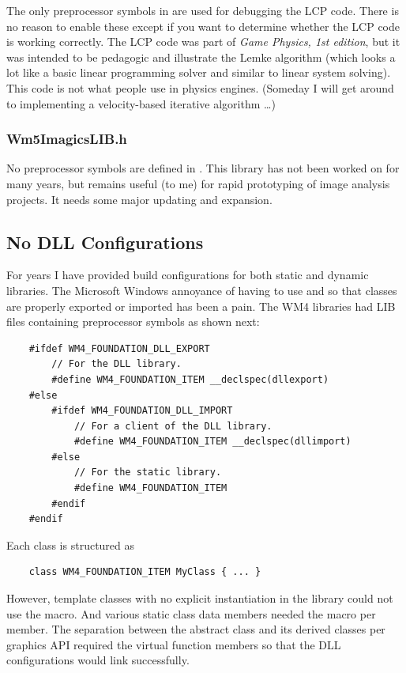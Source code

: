 \documentclass{article}
\begin{document}
The only preprocessor symbols in  are used for debugging
the LCP code.  There is no reason to enable these except if you want to
determine whether the LCP code is working correctly.  The LCP code was
part of {\em Game Physics, 1st edition}, but it was intended to be pedagogic
and illustrate the Lemke algorithm (which looks a lot like a basic linear
programming solver and similar to linear system solving).  This code is not
what people use in physics engines.  (Someday I will get around to implementing
a velocity-based iterative algorithm \ldots)

\subsubsection{Wm5ImagicsLIB.h}

No preprocessor symbols are defined in .  This library
has not been worked on for many years, but remains useful (to me) for rapid
prototyping of image analysis projects.  It needs some major updating and
expansion.


\subsection{No DLL Configurations}

For years I have provided build configurations for both static and dynamic
libraries.  The Microsoft Windows annoyance of having to use
 and  so that
classes are properly exported or imported has been a pain.  The WM4
libraries had LIB files containing preprocessor symbols as shown next:
\begin{verbatim}
    #ifdef WM4_FOUNDATION_DLL_EXPORT
        // For the DLL library.
        #define WM4_FOUNDATION_ITEM __declspec(dllexport)
    #else
        #ifdef WM4_FOUNDATION_DLL_IMPORT
            // For a client of the DLL library.
            #define WM4_FOUNDATION_ITEM __declspec(dllimport)
        #else
            // For the static library.
            #define WM4_FOUNDATION_ITEM
        #endif
    #endif
\end{verbatim}
Each class is structured as
\begin{verbatim}
    class WM4_FOUNDATION_ITEM MyClass { ... }
\end{verbatim}
However, template classes with no explicit instantiation in the library
could not use the  macro.  And various
static class data members needed the macro per member.  The separation
between the abstract  class and its derived classes per
graphics API required the virtual function members so that the DLL configurations
would link successfully.
\end{document}
